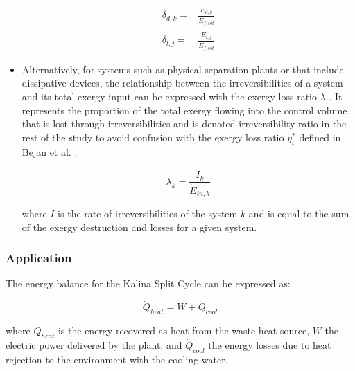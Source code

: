 \documentclass[final,times,5p]{elsarticle}
\begin{document}
\begin{itemize}
	\begin{align}
		\delta_{d,k}=&\frac{\dot{E}_{d,k}}{\dot{E}_{f,tot}} \\
		\delta_{l,j}=&\frac{\dot{E}_{l,j}}{\dot{E}_{f,tot}}
	\end{align}
	
	\item Alternatively, for systems such as physical separation plants or that include dissipative devices, the relationship between the irreversibilities of a system and its total exergy input can be expressed with the exergy loss ratio $\lambda$ \cite{Kotas1980a,Kotas1995}. It represents the proportion of the total exergy flowing into the control volume that is lost through irreversibilities and is denoted irreversibility ratio in the rest of the study to avoid confusion with the exergy loss ratio $y^*_l$ defined in Bejan et al. \cite{BejanAdrian;TsatsaronisGeorge;Moran1996}. 
	
	\begin{equation}
			\lambda_k=\frac{\dot{I}_k}{\dot{E}_{in,k}}
	\end{equation}
	
	where $\dot{I}$ is the rate of irreversibilities of the system $k$ and is equal to the sum of the exergy destruction and losses for a given system. 

	\end{itemize}
	

	\subsubsection{Application}
	
	The energy balance for the Kalina Split Cycle can be expressed as: 

	\begin{equation}
	 \dot{Q}_{heat}=\dot{W}+\dot{Q}_{cool}
	\end{equation}	

	where $\dot{Q}_{heat}$ is the energy recovered as heat from the waste heat source, $\dot{W}$ the electric power delivered by the plant, and $\dot{Q}_{cool}$ the energy losses due to heat rejection to the environment with the cooling water.
	
\end{document}

